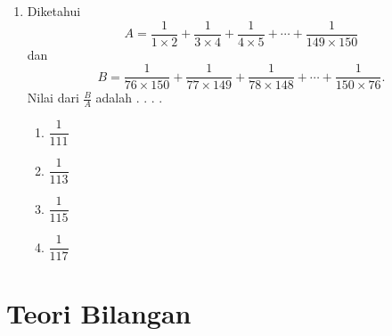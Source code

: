 \documentclass[12pt]{scrartcl}
\begin{document}
\begin{enumerate}[label={Soal \arabic*}]
    \item Diketahui
    $$ A =\frac{1}{1\times 2} + \frac{1}{3\times 4}+\frac{1}{4\times 5}+\cdots + \frac{1}{149\times 150} $$
    dan 
    $$ B =\frac{1}{76\times 150} + \frac{1}{77\times 149} + \frac{1}{78\times 148}+\cdots + \frac{1}{150\times 76}. $$
    Nilai dari $\frac{B}{A}$ adalah . . . .
    \begin{enumerate}[label={(\Alph*)}]
        \item $\dfrac{1}{111}$ \item $\dfrac{1}{113}$ \item $\dfrac{1}{115}$ \item $\dfrac{1}{117}$
    \end{enumerate}
\end{enumerate}

\section*{Teori Bilangan}
\end{document}
